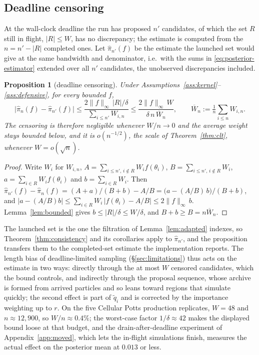 \documentclass[10pt]{article}
\theoremstyle{plain}
\newtheorem{proposition}[theorem]{Proposition}
\theoremstyle{definition}
\begin{document}
\subsection{Deadline censoring}\label{app:theory-censoring}
At the wall-clock deadline the run has proposed $n'$ candidates, of which the set $R$ still in flight, $|R|\le W$, has no discrepancy; the estimate is computed from the $n=n'-|R|$ completed ones. Let $\widehat\pi_{n'}(f)$ be the estimate the launched set would give at the same bandwidth and denominator, i.e.\ with the sums in \eqref{eq:posterior-estimator} extended over all $n'$ candidates, the unobserved discrepancies included.
\begin{proposition}[deadline censoring]\label{prop:censoring}
Under Assumptions~\ref{ass:kernel}--\ref{ass:defensive}, for every bounded $f$,
\[
\bigl|\widehat\pi_n(f)-\widehat\pi_{n'}(f)\bigr|
\le\frac{2\|f\|_\infty\,|R|/\delta}{\sum_{i\le n'}W_{i,n}}
\le\frac{2\|f\|_\infty\,W}{\delta\,n\,\overline W_n},
\qquad \overline W_n:=\tfrac1n\textstyle\sum_{i\le n}W_{i,n} .
\]
The censoring is therefore negligible whenever $W/n\to0$ and the average weight stays bounded below, and it is $o(n^{-1/2})$, the scale of Theorem~\ref{thm:clt}, whenever $W=o(\sqrt n)$.
\end{proposition}
\begin{proof}
Write $W_i$ for $W_{i,n}$, $A=\sum_{i\le n',\,i\notin R}W_if(\theta_i)$, $B=\sum_{i\le n',\,i\notin R}W_i$, $a=\sum_{i\in R}W_if(\theta_i)$ and $b=\sum_{i\in R}W_i$. Then $\widehat\pi_{n'}(f)-\widehat\pi_n(f)=(A+a)/(B+b)-A/B=\bigl(a-(A/B)\,b\bigr)/(B+b)$, and $|a-(A/B)b|\le\sum_{i\in R}W_i\,|f(\theta_i)-A/B|\le2\|f\|_\infty\,b$. Lemma~\ref{lem:bounded} gives $b\le|R|/\delta\le W/\delta$, and $B+b\ge B=n\overline W_n$.
\end{proof}
The launched set is the one the filtration of Lemma~\ref{lem:adapted} indexes, so Theorem~\ref{thm:consistency} and its corollaries apply to $\widehat\pi_{n'}$, and the proposition transfers them to the completed-set estimate the implementation reports. The length bias of deadline-limited sampling (\S\ref{sec:limitations}) thus acts on the estimate in two ways: directly through the at most $W$ censored candidates, which the bound controls, and indirectly through the proposal sequence, whose archive is formed from arrived particles and so leans toward regions that simulate quickly; the second effect is part of $\tilde q_i$ and is corrected by the importance weighting up to $r$. On the five Cellular Potts production replicates, $W=48$ and $n\approx12{,}900$, so $W/n\approx0.4\%$; the worst-case factor $1/\delta\approx42$ makes the displayed bound loose at that budget, and the drain-after-deadline experiment of Appendix~\ref{app:moved}, which lets the in-flight simulations finish, measures the actual effect on the posterior mean at $0.013$ or less.
\end{document}

